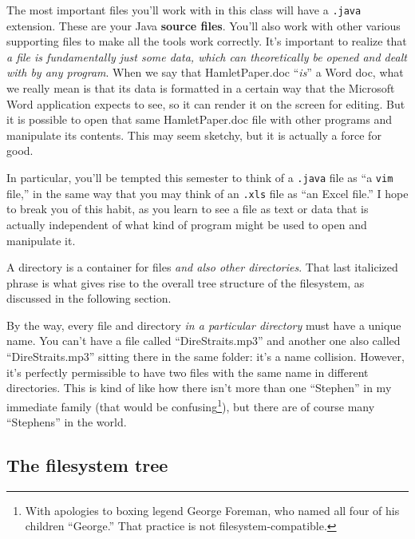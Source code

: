 The most important files you'll work with in this class will have a
\texttt{.java} extension. These are your Java \textbf{source files}. You'll
also work with other various supporting files to make all the tools work
correctly. It's important to realize that \textit{a file is fundamentally just
some data, which can theoretically be opened and dealt with by any program}.
When we say that HamletPaper.doc ``\textit{is}'' a Word doc, what we really
mean is that its data is formatted in a certain way that the Microsoft Word
application expects to see, so it can render it on the screen for editing. But
it is possible to open that same HamletPaper.doc file with other programs and
manipulate its contents. This may seem sketchy, but it is actually a force for
good.

In particular, you'll be tempted this semester to think of a \texttt{.java}
file as ``a \texttt{vim} file,'' in the same way that you may think of an
\texttt{.xls} file as ``an Excel file.'' I hope to break you of this habit, as
you learn to see a file as text or data that is actually independent of what
kind of program might be used to open and manipulate it.

A directory is a container for files \textit{and also other directories}. That
last italicized phrase is what gives rise to the overall tree structure of the
filesystem, as discussed in the following section.

By the way, every file and directory \textit{in a particular directory} must
have a unique name. You can't have a file called ``DireStraits.mp3'' and
another one also called ``DireStraits.mp3'' sitting there in the same folder:
it's a name collision. However, it's perfectly permissible to have two files
with the same name in different directories. This is kind of like how there
isn't more than one ``Stephen'' in my immediate family (that would be
confusing\footnote{With apologies to boxing legend George Foreman, who named
all four of his children ``George.'' That practice is not
filesystem-compatible.}), but there are of course many ``Stephens'' in the
world.

\subsection{The filesystem tree}

